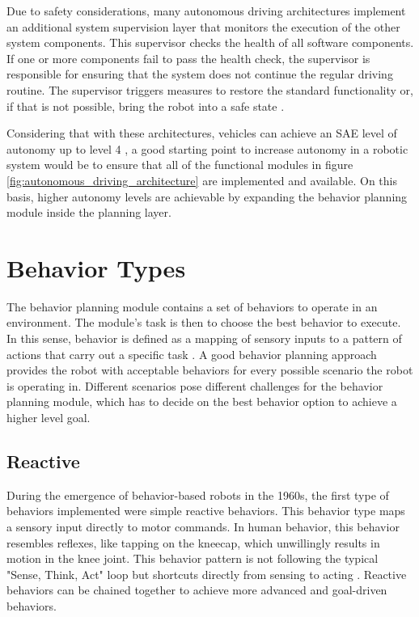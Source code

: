 Due to safety considerations, many autonomous driving architectures implement an additional system supervision layer that monitors the execution of the other system components. This supervisor checks the health of all software components. If one or more components fail to pass the health check, the supervisor is responsible for ensuring that the system does not continue the regular driving routine. The supervisor triggers measures to restore the standard functionality or, if that is not possible, bring the robot into a safe state \cite{zimmermann2020adaptive}.

Considering that with these architectures, vehicles can achieve an SAE level of autonomy up to level 4 \cite{bacha2008odin}, a good starting point to increase autonomy in a robotic system would be to ensure that all of the functional modules in figure \ref{fig:autonomous_driving_architecture} are implemented and available. On this basis, higher autonomy levels are achievable by expanding the behavior planning module inside the planning layer. 


\section{Behavior Types}
\label{sec:Behavior Types}

The behavior planning module contains a set of behaviors to operate in an environment. The module's task is then to choose the best behavior to execute. In this sense, behavior is defined as a mapping of sensory inputs to a pattern of actions that carry out a specific task \cite{murphy2000}. A good behavior planning approach provides the robot with acceptable behaviors for every possible scenario the robot is operating in. Different scenarios pose different challenges for the behavior planning module, which has to decide on the best behavior option to achieve a higher level goal. 

\subsection{Reactive}

During the emergence of behavior-based robots in the 1960s, the first type of behaviors implemented were simple reactive behaviors. This behavior type maps a sensory input directly to motor commands. In human behavior, this behavior resembles reflexes, like tapping on the kneecap, which unwillingly results in motion in the knee joint. This behavior pattern is not following the typical "Sense, Think, Act" loop but shortcuts directly from sensing to acting \cite{desilva2008}. Reactive behaviors can be chained together to achieve more advanced and goal-driven behaviors. 

